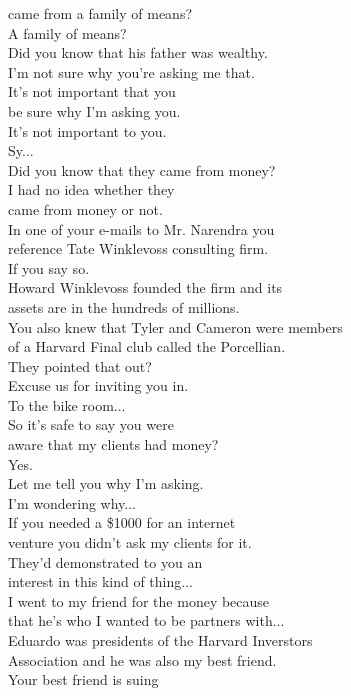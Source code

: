 \documentclass{article}
\begin{document}
\begin{multicols}{3}
came from a family of means?\\
A family of means?\\
Did you know that his father was wealthy.\\
I'm not sure why you're asking me that.\\
It's not important that you\\
be sure why I'm asking you.\\
It's not important to you.\\
Sy...\\
Did you know that they came from money?\\
I had no idea whether they\\
came from money or not.\\
In one of your e-mails to Mr. Narendra you\\
reference Tate Winklevoss consulting firm.\\
If you say so.\\
Howard Winklevoss founded the firm and its\\
assets are in the hundreds of millions.\\
You also knew that Tyler and Cameron were members\\
of a Harvard Final club called the Porcellian.\\
They pointed that out?\\
Excuse us for inviting you in.\\
To the bike room...\\
So it's safe to say you were\\
aware that my clients had money?\\
Yes.\\
Let me tell you why I'm asking.\\
I'm wondering why...\\
If you needed a \$1000 for an internet\\
venture you didn't ask my clients for it.\\
They'd demonstrated to you an\\
interest in this kind of thing...\\
I went to my friend for the money because\\
that he's who I wanted to be partners with...\\
Eduardo was presidents of the Harvard Inverstors\\
Association and he was also my best friend.\\
Your best friend is suing\\

\end{multicols}
\end{document}
